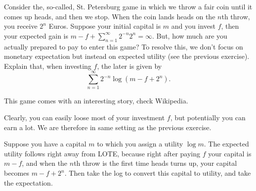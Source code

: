 \begin{exercise}
Consider the, so-called, St.
Petersburg game in which we throw a fair coin until it comes up heads, and then we stop.
When the coin lands heads on the $n$th throw, you receive $2^{n}$ Euros.
Suppose your initial capital is $m$ and you invest $f$, then your expected gain is $m-f + \sum_{n=1}^{\infty} 2^{-n} 2^{n} = \infty$.
But, how much are you actually prepared to pay to enter this game?
To resolve this, we don't focus on monetary expectation but instead on expected utility (see the previous exercise).
Explain that, when investing $f$, the later is given by
\begin{equation}
  \label{eq:135}
  \sum_{n=1}^{\infty} 2^{-n}\log(m - f + 2^{n}).
\end{equation}
\begin{solution}
This game comes with an interesting story,  check Wikipedia.

Clearly, you can easily loose most of your investment $f$, but potentially you can earn a lot. We are therefore in same setting as the previous exercise.

Suppose you have a capital $m$ to which you assign a utility $\log m$.
The expected utility follows right away from LOTE,
because right after paying $f$ your capital is $m-f$, and when the $n$th throw is the first time heads turns up, your capital becomes $m-f+2^{n}$.
Then take the log to convert this capital to utility, and take the expectation.
\end{solution}
\end{exercise}


